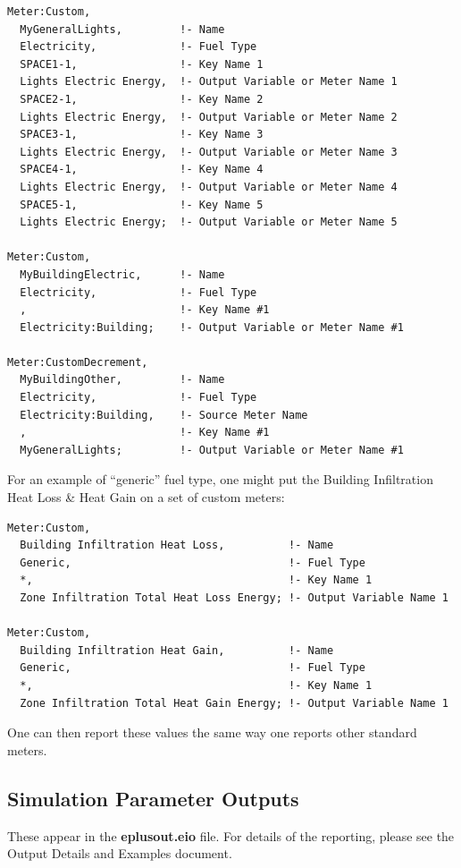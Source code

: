 \begin{lstlisting}
Meter:Custom,
  MyGeneralLights,         !- Name
  Electricity,             !- Fuel Type
  SPACE1-1,                !- Key Name 1
  Lights Electric Energy,  !- Output Variable or Meter Name 1
  SPACE2-1,                !- Key Name 2
  Lights Electric Energy,  !- Output Variable or Meter Name 2
  SPACE3-1,                !- Key Name 3
  Lights Electric Energy,  !- Output Variable or Meter Name 3
  SPACE4-1,                !- Key Name 4
  Lights Electric Energy,  !- Output Variable or Meter Name 4
  SPACE5-1,                !- Key Name 5
  Lights Electric Energy;  !- Output Variable or Meter Name 5

Meter:Custom,
  MyBuildingElectric,      !- Name
  Electricity,             !- Fuel Type
  ,                        !- Key Name #1
  Electricity:Building;    !- Output Variable or Meter Name #1

Meter:CustomDecrement,
  MyBuildingOther,         !- Name
  Electricity,             !- Fuel Type
  Electricity:Building,    !- Source Meter Name
  ,                        !- Key Name #1
  MyGeneralLights;         !- Output Variable or Meter Name #1
\end{lstlisting}

For an example of ``generic'' fuel type, one might put the Building Infiltration Heat Loss \& Heat Gain on a set of custom meters:

\begin{lstlisting}
Meter:Custom,
  Building Infiltration Heat Loss,          !- Name
  Generic,                                  !- Fuel Type
  *,                                        !- Key Name 1
  Zone Infiltration Total Heat Loss Energy; !- Output Variable Name 1

Meter:Custom,
  Building Infiltration Heat Gain,          !- Name
  Generic,                                  !- Fuel Type
  *,                                        !- Key Name 1
  Zone Infiltration Total Heat Gain Energy; !- Output Variable Name 1
\end{lstlisting}

One can then report these values the same way one reports other standard meters.

\subsection{Simulation Parameter Outputs}\label{simulation-parameter-outputs}

These appear in the \textbf{eplusout.eio} file. For details of the reporting, please see the Output Details and Examples document.
